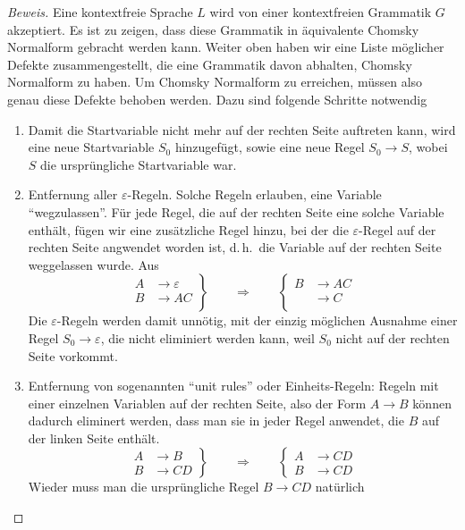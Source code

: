 \begin{proof}[Beweis]
Eine kontextfreie Sprache $L$ wird von einer kontextfreien Grammatik
$G$ akzeptiert. Es ist zu zeigen, dass diese Grammatik in
äquivalente Chomsky Normalform gebracht werden kann.
Weiter oben haben wir eine Liste
möglicher Defekte zusammengestellt, die eine Grammatik davon abhalten,
Chomsky Normalform zu haben. Um Chomsky Normalform zu erreichen,
müssen also genau diese Defekte behoben werden.
Dazu sind folgende Schritte notwendig
\begin{enumerate}
\item Damit die Startvariable nicht mehr auf der rechten Seite auftreten
kann, wird eine neue Startvariable $S_0$ hinzugefügt, sowie eine
neue Regel
$S_0\to S$, wobei $S$ die ursprüngliche Startvariable war.
\item Entfernung aller $\varepsilon$-Regeln. Solche Regeln erlauben,
eine Variable ``wegzulassen''. Für jede Regel, die auf der rechten
Seite eine solche Variable enthält, fügen wir eine zusätzliche
Regel hinzu, bei der die $\varepsilon$-Regel auf der rechten Seite
angwendet worden ist, d.\,h.~die Variable auf der rechten Seite weggelassen
wurde.  Aus
\[
\left.
\begin{aligned}
A&\to\varepsilon\\
B&\to AC\\
\end{aligned}
\right\}
\qquad
\Rightarrow
\qquad
\left\{
\begin{aligned}
B&\to AC\\
&\to C\\
\end{aligned}
\right.
\]
Die $\varepsilon$-Regeln werden damit unnötig, mit der einzig
möglichen Ausnahme einer Regel $S_0\to\varepsilon$, die nicht
eliminiert werden kann, weil $S_0$ nicht auf der rechten Seite
vorkommt.
\item Entfernung von sogenannten ``unit rules'' oder Einheits-Regeln:
Regeln mit einer einzelnen Variablen auf der rechten Seite, also
der Form $A\to B$ können dadurch eliminert werden, dass man
sie in jeder Regel anwendet, die $B$ auf der linken Seite enthält.
\[
\left.
\begin{aligned}
A&\to B\\
B&\to CD
\end{aligned}
\right\}
\qquad\Rightarrow\qquad
\left\{
\begin{aligned}
A&\to CD\\
B&\to CD
\end{aligned}
\right.
\]
Wieder muss man die ursprüngliche Regel $B\to CD$ natürlich

\end{enumerate}
\end{proof}
